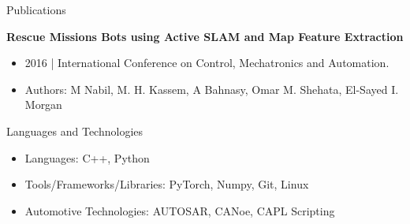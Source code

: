 \documentclass[]{mcdowellcv}
\begin{document}
	\begin{cvsection}{Publications}
		\begin{cvsubsection}{}{}{}
			\textbf{Rescue Missions Bots using Active SLAM and Map Feature Extraction}
			\begin{itemize}
				\item 2016 | International Conference on Control, Mechatronics and Automation.
				\item Authors: M Nabil,  M. H. Kassem, A Bahnasy, Omar M. Shehata, El-Sayed I. Morgan
			\end{itemize}
		\end{cvsubsection}
	\end{cvsection}
	
	\begin{cvsection}{Languages and Technologies}
		\begin{cvsubsection}{}{}{}	
			\begin{itemize}
				\item Languages: C++, Python
				\item Tools/Frameworks/Libraries: PyTorch, Numpy, Git, Linux
				\item Automotive Technologies: AUTOSAR, CANoe, CAPL Scripting
			\end{itemize}
		\end{cvsubsection}
	\end{cvsection}

\iffalse
	\begin{cvsection}{Extra-Curricular Activities}
		\begin{cvsubsection}{Volunteering}{}{}	
			
			\begin{itemize}
				\item Dive In TEDxTUM Event | Operations Volunteer | Munich, Nov. 2019
				\item Coral Reefs Cleaning campaign | SCUBA Diver Volunteer | Nuweiba, RedSea, Egypt | Mar. 2019
				\item Cairo Runners Cairo Half Marathon 2016 | Operations Volunteer | Cairo, Apr. 2016
				\item Alashanek Ya Balady for Sustainable Development, NGO | Operations Volunteer  Nov. 2013 -- Jun. 2016
			\end{itemize}
		\end{cvsubsection}
	\end{cvsection}
\fi
	
	
\end{document}
